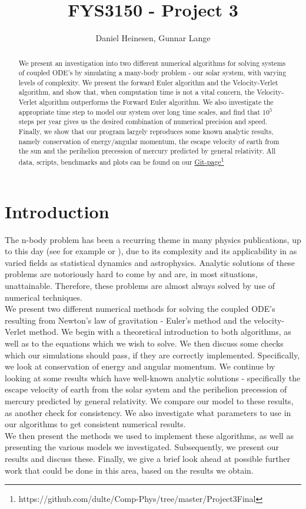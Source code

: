 \documentclass[a4paper, 10pt]{article}
\title{FYS3150 - Project 3}
\author{Daniel Heinesen, Gunnar Lange}
\begin{document}
\maketitle
\begin{abstract}
We present an investigation into two different numerical algorithms for solving systems of coupled ODE's by simulating a many-body problem - our solar system, with varying levels of complexity. We present the forward Euler algorithm and the Velocity-Verlet algorithm, and show that, when computation time is not a vital concern, the Velocity-Verlet algorithm outperforms the Forward Euler algorithm. We also investigate the appropriate time step to model our system over long time scales, and find that $10^5$ steps per year gives us the desired combination of numerical precision and speed. Finally, we show that our program largely reproduces some known analytic results, namely conservation of energy/angular momentum, the escape velocity of earth from the sun and the perihelion precession of mercury predicted by general relativity. All data, scripts, benchmarks and plots can be found on our \href{https://github.com/dulte/Comp-Phys/tree/master/Project3Final}{Git-page}\footnote{https://github.com/dulte/Comp-Phys/tree/master/Project3Final}
\end{abstract}
\newpage
\tableofcontents
\newpage
\section{Introduction}
The n-body problem has been a recurring theme in many physics publications, up to this day (see for example \cite{PhysRevLett.19.1312} or \cite{Diacu2012} ), due to its complexity and its applicability in as varied fields as statistical dynamics and astrophysics.  Analytic solutions of these problems are notoriously hard to come by and are, in most situations, unattainable. Therefore, these problems are almost always solved by use of numerical techniques.\\
\linebreak
We present two different numerical methods for solving the coupled ODE's resulting from Newton's law of gravitation - Euler's method and the velocity-Verlet method. We begin with a theoretical introduction to both algorithms, as well as to the equations which we wish to solve. We then discuss some checks which our simulations should pass, if they are correctly implemented. Specifically, we look at conservation of energy and angular momentum. We continue by looking at some results which have well-known analytic solutions - specifically the escape velocity of earth from the solar system and the perihelion precession of mercury predicted by general relativity. We compare our model to these results, as another check for consistency. We also investigate what parameters to use in our algorithms to get consistent numerical results.\\
\linebreak
We then present the methods we used to implement these algorithms, as well as presenting the various models we investigated. Subsequently, we present our results and discuss these. Finally, we give a brief look ahead at possible further work that could be done in this area, based on the results we obtain. 
\end{document}
